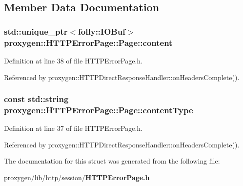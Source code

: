 \subsection{Member Data Documentation}
\subsubsection[{content}]{\setlength{\rightskip}{0pt plus 5cm}std\+::unique\+\_\+ptr$<$folly\+::\+I\+O\+Buf$>$ proxygen\+::\+H\+T\+T\+P\+Error\+Page\+::\+Page\+::content}\label{structproxygen_1_1HTTPErrorPage_1_1Page_accf2235ade1bfc073b305d453666e5a2}


Definition at line 38 of file H\+T\+T\+P\+Error\+Page.\+h.



Referenced by proxygen\+::\+H\+T\+T\+P\+Direct\+Response\+Handler\+::on\+Headers\+Complete().

\subsubsection[{content\+Type}]{\setlength{\rightskip}{0pt plus 5cm}const std\+::string proxygen\+::\+H\+T\+T\+P\+Error\+Page\+::\+Page\+::content\+Type}\label{structproxygen_1_1HTTPErrorPage_1_1Page_abec8e06143791f1f3a3ce68e93c2d4b0}


Definition at line 37 of file H\+T\+T\+P\+Error\+Page.\+h.



Referenced by proxygen\+::\+H\+T\+T\+P\+Direct\+Response\+Handler\+::on\+Headers\+Complete().



The documentation for this struct was generated from the following file\+:\begin{DoxyCompactItemize}
\item 
proxygen/lib/http/session/{\bf H\+T\+T\+P\+Error\+Page.\+h}\end{DoxyCompactItemize}
